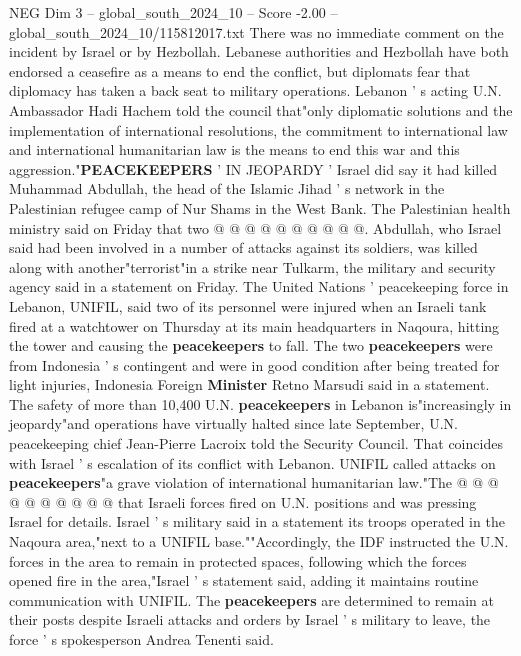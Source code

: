 \begin{textsample}{NEG Dim 3 – global\_south\_2024\_10 – Score -2.00 – global\_south\_2024\_10/115812017.txt}
There was no immediate comment on the incident by Israel or by Hezbollah.
Lebanese authorities and Hezbollah have both endorsed a ceasefire as a means to end the conflict, but diplomats fear that diplomacy has taken a back seat to military operations.
Lebanon ' s acting U.N.
Ambassador Hadi Hachem told the council that"only diplomatic solutions and the implementation of international resolutions, the commitment to international law and international humanitarian law is the means to end this war and this aggression."\textbf{PEACEKEEPERS} ' IN JEOPARDY ' Israel did say it had killed Muhammad Abdullah, the head of the Islamic Jihad ' s network in the Palestinian refugee camp of Nur Shams in the West Bank.
The Palestinian health ministry said on Friday that two @ @ @ @ @ @ @ @ @ @.
Abdullah, who Israel said had been involved in a number of attacks against its soldiers, was killed along with another"terrorist"in a strike near Tulkarm, the military and security agency said in a statement on Friday.
The United Nations ' peacekeeping force in Lebanon, UNIFIL, said two of its personnel were injured when an Israeli tank fired at a watchtower on Thursday at its main headquarters in Naqoura, hitting the tower and causing the \textbf{peacekeepers} to fall.
The two \textbf{peacekeepers} were from Indonesia ' s contingent and were in good condition after being treated for light injuries, Indonesia Foreign \textbf{Minister} Retno Marsudi said in a statement.
The safety of more than 10,400 U.N. \textbf{peacekeepers} in Lebanon is"increasingly in jeopardy"and operations have virtually halted since late September, U.N. peacekeeping chief Jean-Pierre Lacroix told the Security Council.
That coincides with Israel ' s escalation of its conflict with Lebanon.
UNIFIL called attacks on \textbf{peacekeepers}"a grave violation of international humanitarian law."The @ @ @ @ @ @ @ @ @ @ that Israeli forces fired on U.N. positions and was pressing Israel for details.
Israel ' s military said in a statement its troops operated in the Naqoura area,"next to a UNIFIL base.""Accordingly, the IDF instructed the U.N. forces in the area to remain in protected spaces, following which the forces opened fire in the area,"Israel ' s statement said, adding it maintains routine communication with UNIFIL.
The \textbf{peacekeepers} are determined to remain at their posts despite Israeli attacks and orders by Israel ' s military to leave, the force ' s spokesperson Andrea Tenenti said.

\end{textsample}
